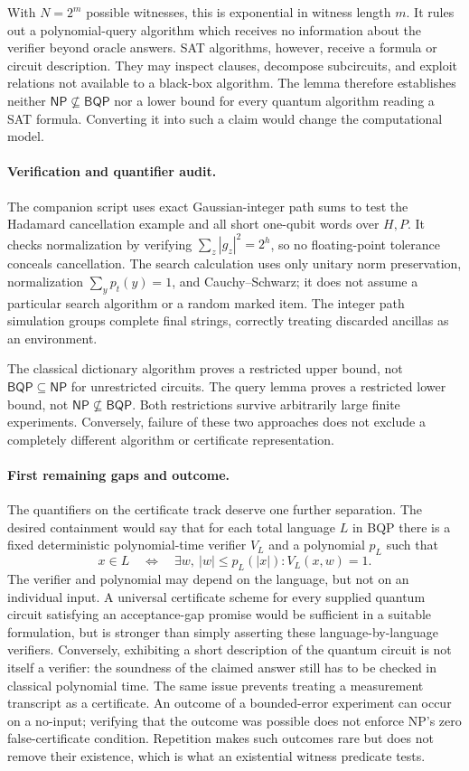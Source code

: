 \documentclass[11pt]{article}
\begin{document}
With $N=2^m$ possible witnesses, this is exponential in witness length $m$.
It rules out a polynomial-query algorithm which receives no information
about the verifier beyond oracle answers. SAT algorithms, however, receive
a formula or circuit description. They may inspect clauses, decompose
subcircuits, and exploit relations not available to a black-box algorithm.
The lemma therefore establishes neither $\mathsf{NP}\nsubseteq\mathsf{BQP}$
nor a lower bound for every quantum algorithm reading a SAT formula.
Converting it into such a claim would change the computational model.

\paragraph{Verification and quantifier audit.}
The companion script uses exact Gaussian-integer path sums to test the
Hadamard cancellation example and all short one-qubit words over $H,P$.
It checks normalization by verifying $\sum_z|g_z|^2=2^h$, so no floating-point
tolerance conceals cancellation. The search calculation uses only unitary
norm preservation, normalization $\sum_y p_t(y)=1$, and Cauchy--Schwarz;
it does not assume a particular search algorithm or a random marked item.
The integer path simulation groups complete final strings, correctly treating
discarded ancillas as an environment.

The classical dictionary algorithm proves a restricted upper bound, not
$\mathsf{BQP}\subseteq\mathsf{NP}$ for unrestricted circuits. The query
lemma proves a restricted lower bound, not
$\mathsf{NP}\nsubseteq\mathsf{BQP}$. Both restrictions survive arbitrarily
large finite experiments. Conversely, failure of these two approaches does
not exclude a completely different algorithm or certificate representation.

\paragraph{First remaining gaps and outcome.}
The quantifiers on the certificate track deserve one further separation.
The desired containment would say that for each total language $L$ in BQP
there is a fixed deterministic polynomial-time verifier $V_L$ and a
polynomial $p_L$ such that
\[
 x\in L\quad\Longleftrightarrow\quad
 \exists w,\ |w|\le p_L(|x|):V_L(x,w)=1.
\]
The verifier and polynomial may depend on the language, but not on an
individual input. A universal certificate scheme for every supplied quantum
circuit satisfying an acceptance-gap promise would be sufficient in a
suitable formulation, but is stronger than simply asserting these
language-by-language verifiers. Conversely, exhibiting a short description
of the quantum circuit is not itself a verifier: the soundness of the
claimed answer still has to be checked in classical polynomial time.
The same issue prevents treating a measurement transcript as a certificate.
An outcome of a bounded-error experiment can occur on a no-input; verifying
that the outcome was possible does not enforce NP's zero false-certificate
condition. Repetition makes such outcomes rare but does not remove their
existence, which is what an existential witness predicate tests.
\end{document}
